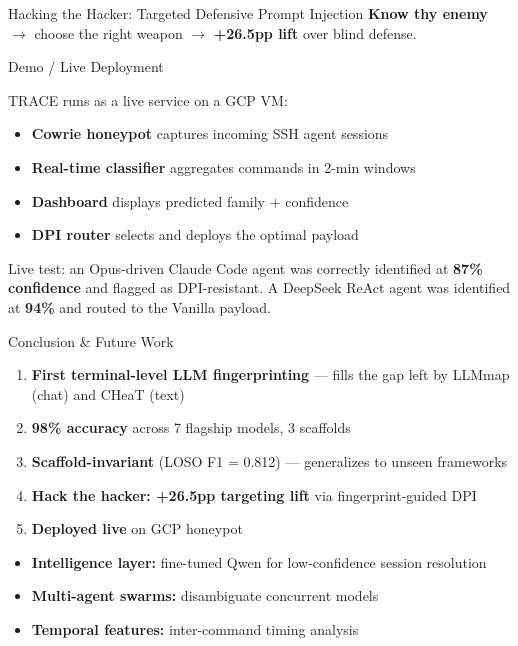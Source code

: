 \documentclass[final]{beamer}
\newlength{\colwidth}
\begin{document}
\begin{frame}[t]
\begin{columns}[t]
\begin{column}{\colwidth}
\begin{alertblock}{Hacking the Hacker: Targeted Defensive Prompt Injection}
    \textbf{Know thy enemy} $\rightarrow$ choose the right weapon $\rightarrow$
    \textbf{+26.5pp lift} over blind defense.

  \end{alertblock}

  \begin{block}{Demo / Live Deployment}

    TRACE runs as a live service on a GCP VM:
    \begin{itemize}
      \item \textbf{Cowrie honeypot} captures incoming SSH agent sessions
      \item \textbf{Real-time classifier} aggregates commands in 2-min windows
      \item \textbf{Dashboard} displays predicted family + confidence
      \item \textbf{DPI router} selects and deploys the optimal payload
    \end{itemize}

    Live test: an Opus-driven Claude Code agent was correctly identified at
    \textbf{87\% confidence} and flagged as DPI-resistant. A DeepSeek ReAct
    agent was identified at \textbf{94\%} and routed to the Vanilla payload.

  \end{block}

  \begin{alertblock}{Conclusion \& Future Work}


    \begin{enumerate}
      \item \textbf{First terminal-level LLM fingerprinting} --- fills the gap
            left by LLMmap (chat) and CHeaT (text)
      \item \textbf{98\% accuracy} across 7 flagship models, 3 scaffolds
      \item \textbf{Scaffold-invariant} (LOSO F1 = 0.812) --- generalizes to unseen frameworks
      \item \textbf{Hack the hacker: +26.5pp targeting lift} via fingerprint-guided DPI
      \item \textbf{Deployed live} on GCP honeypot
    \end{enumerate}


    \begin{itemize}
      \item \textbf{Intelligence layer:} fine-tuned Qwen for low-confidence
            session resolution
      \item \textbf{Multi-agent swarms:} disambiguate concurrent models
      \item \textbf{Temporal features:} inter-command timing analysis
    \end{itemize}


\end{alertblock}
\end{column}
\end{columns}
\end{frame}
\end{document}
